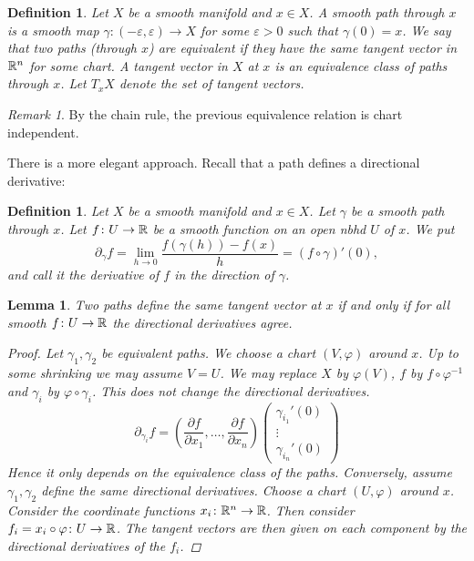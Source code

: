 \documentclass[A4paper, british, reqno]{amsart}
\theoremstyle{darkgreentheorem}
\newtheorem{lm}[thm]{Lemma}
\theoremstyle{darkbluedefinition}
\newtheorem{defn}[thm]{Definition}
\theoremstyle{darkredexample}
\theoremstyle{remark}
\newtheorem{rem}[thm]{Remark}
\newcommand{\1}{\mathbbm{1}}
\begin{document}
\begin{defn}
    Let $X$ be a smooth manifold and $x\in X$.
    A \textit{smooth path} through $x$ is a smooth map $\gamma\colon (-\varepsilon ,\varepsilon )\to X$ for some $\varepsilon >0$ such that $\gamma(0)=x$.
    We say that two paths (through $x$) are equivalent if they have the same tangent vector in $\mathbb{R}^{n}$ for some chart.
    A \textit{tangent vector} in $X$ at $x$ is an equivalence class of paths through $x$.
    Let $T_{x}X$ denote the set of tangent vectors.
\end{defn}

\begin{rem}
    By the chain rule, the previous equivalence relation is chart independent.
\end{rem}

There is a more elegant approach.
Recall that a path defines a directional derivative:

\begin{defn}
    Let $X$ be a smooth manifold and $x\in X$.
    Let $\gamma $ be a smooth path through $x$.
    Let $f\colon U\to \mathbb{R}$ be a smooth function on an open nbhd $U$ of $x$.
    We put
    \[ \partial_{\gamma}f=\lim_{h\to 0}\frac{f(\gamma(h))-f(x)}{h}=(f\circ \gamma)'(0),\]
    and call it the \textit{derivative of $f$ in the direction of $\gamma$}.
\end{defn}

\begin{lm}
    Two paths define the same tangent vector at $x$ if and only if for all smooth $f\colon U\to \mathbb{R}$ the directional derivatives agree.
    \begin{proof}
	Let $\gamma_{1},\gamma_{2}$ be equivalent paths.
	We choose a chart $(V,\varphi)$ around $x$.
	Up to some shrinking we may assume $V=U$.
	We may replace $X$ by $\varphi(V)$, $f$ by $f\circ \varphi^{-1}$ and $\gamma_{i}$ by $\varphi\circ \gamma_{i}$.
	This does not change the directional derivatives.
	\[ \partial_{\gamma_{i}}f=\left( \frac{\partial f}{\partial x_{1}},\ldots,\frac{\partial f}{\partial x_{n}}\right )\begin{pmatrix} \gamma_{i_{1}}'(0) \\ \vdots \\ \gamma_{i_{n}}'(0)\end{pmatrix} \]
	Hence it only depends on the equivalence class of the paths.
	Conversely, assume $\gamma_{1},\gamma_{2}$ define the same directional derivatives.
	Choose a chart $(U,\varphi)$ around $x$.
	Consider the coordinate functions $x_{i}\colon \mathbb{R}^{n}\to \mathbb{R}$.
	Then consider $f_{i}=x_{i}\circ \varphi \colon U\to \mathbb{R}$.
	The tangent vectors are then given on each component by the directional derivatives of the $f_{i}$.
    \end{proof}
\end{lm}
\end{document}

